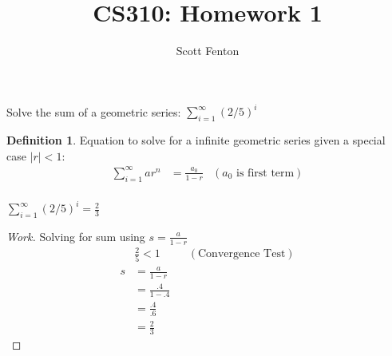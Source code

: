 \documentclass[10pt]{article}
\newenvironment{exercise}[2][Exercise]{\begin{trivlist}
\item[\hskip \labelsep {\bfseries #1}\hskip \labelsep {\bfseries #2.}]}{\end{trivlist}}
\newenvironment{solution}[2][Solution]{\begin{trivlist}
\item[\hskip \labelsep {\bfseries #1}\hskip \labelsep {\bfseries #2.}]}{\end{trivlist}}
\theoremstyle{definition}
\newtheorem*{defn*}{Definition}
\begin{document}
 
 
 
\title{CS310: Homework 1}%
\author{Scott Fenton\\ %
} %
 
\maketitle
 
\begin{exercise}{(1)} %
Solve the sum of a geometric series: $\displaystyle \sum_{i=1}^{\infty}(2/5)^i$
\end{exercise}
 
\begin{defn*}
Equation to solve for a infinite geometric series given a special case $|r| < 1$:
\begin{align*}
\sum_{i=1}^{\infty}ar^n & = \frac{a_0}{1-r} & (\text{$a_0$ is first term})\\ 
\end{align*}
\end{defn*}
 
\begin{solution}{(1)}
$\displaystyle \sum_{i=1}^{\infty}(2/5)^i = \frac{2}{3}$  
\end{solution}
 
\begin{proof}[Work]%
Solving for sum using $ s = \frac{a}{1-r}$
\begin{align}
& \frac{2}{5} < 1 && (\text{Convergence Test})\\
s  & = \frac{a}{1-r}\\
& = \frac{.4}{1-.4}\\
& = \frac{.4}{.6}\\
& = \frac{2}{3}
\end{align}
\end{proof}
\end{document}
